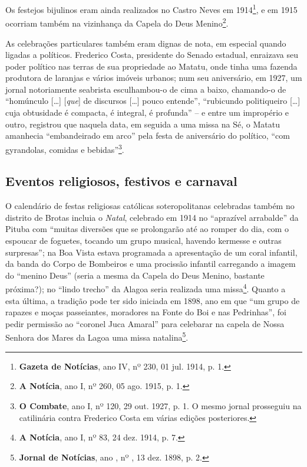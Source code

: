 Os festejos bijulinos eram ainda realizados no Castro Neves em 1914\footnote{\textbf{Gazeta de Notícias}, ano IV, nº 230, 01 jul. 1914, p. 1.}, e em 1915 ocorriam também na vizinhança da Capela do Deus Menino\footnote{\textbf{A Notícia}, ano I, nº 260, 05 ago. 1915, p. 1.}.

As celebrações particulares também eram dignas de nota, em especial quando ligadas a políticos. Frederico Costa, presidente do Senado estadual, enraizava seu poder político nas terras de sua propriedade ao Matatu, onde tinha uma fazenda produtora de laranjas e vários imóveis urbanos; num seu aniversário, em 1927, um jornal notoriamente seabrista esculhambou-o de cima a baixo, chamando-o de ``homúnculo [\dots] [\textit{que}] de discursos [\dots] pouco entende'', ``rubicundo politiqueiro [\dots] cuja obtusidade é compacta, é integral, é profunda'' -- e entre um impropério e outro, registrou que naquela data, em seguida a uma missa na Sé, o Matatu amanhecia ``embandeirado em arco'' pela festa de aniversário do político, ``com gyrandolas, comidas e bebidas''\footnote{\textbf{O Combate}, ano I, nº 120, 29 out. 1927, p. 1. O mesmo jornal prosseguiu na catilinária contra Frederico Costa em várias edições posteriores.}.

\subsection{Eventos religiosos, festivos e carnaval}

O calendário de festas religiosas católicas soteropolitanas celebradas também no distrito de Brotas incluia o \textit{Natal}, celebrado em 1914 no ``aprazível arrabalde'' da Pituba com ``muitas diversões que se prolongarão até ao romper do dia, com o espoucar de foguetes, tocando um grupo musical, havendo kermesse e outras surpresas''; na Boa Vista estava programada a apresentação de um coral infantil, da banda do Corpo de Bombeiros e uma procissão infantil carregando a imagem do ``menino Deus'' (seria a mesma da Capela do Deus Menino, bastante próxima?); no ``lindo trecho'' da Alagoa seria realizada uma missa\footnote{\textbf{A Notícia}, ano I, nº 83, 24 dez. 1914, p. 7.}. Quanto a esta última, a tradição pode ter sido iniciada em 1898, ano em que ``um grupo de rapazes e moças passeiantes, moradores na Fonte do Boi e nas Pedrinhas'', foi pedir permissão ao ``coronel Juca Amaral'' para celebarar na capela de Nossa Senhora dos Mares da Lagoa uma missa natalina\footnote{\textbf{Jornal de Notícias}, ano , nº , 13 dez. 1898, p. 2.}.

